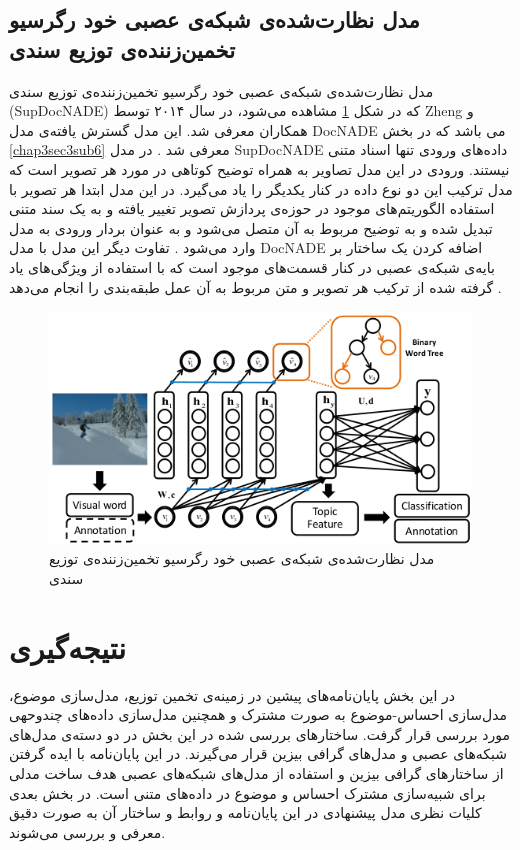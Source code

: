	\subsection{مدل نظارت‌شده‌ی شبکه‌‌ی عصبی خود رگرسیو تخمین‌زننده‌ی توزیع سندی}
	\label{chap3sec5sub1}
	مدل نظارت‌شده‌ی شبکه‌‌ی عصبی خود رگرسیو تخمین‌زننده‌ی توزیع سندی
	(SupDocNADE)
	 که در شکل 
	\ref{chap3-fig10}
	مشاهده می‌شود، در سال ۲۰۱۴ توسط
	Zheng
	و همکاران
	\cite{zheng2014topic}
	معرفی‌ شد. این مدل گسترش یافته‌ی مدل
	DocNADE
	می‌ باشد که در بخش
	\ref{chap3sec3sub6}
	معرفی‌ شد
	\cite{zheng2014topic}.
	 در مدل
	SupDocNADE
	داده‌های ورودی تنها اسناد متنی نیستند. ورودی در این مدل تصاویر به همراه توضیح کوتاهی‌ در مورد هر تصویر است که مدل ترکیب این دو 
	نوع داده در کنار یکدیگر را یاد می‌‌گیرد. در این مدل ابتدا هر تصویر با استفاده الگوریتم‌های موجود در حوزه‌ی پردازش تصویر تغییر یافته و به یک سند متنی تبدیل شده و به توضیح مربوط به آن متصل می‌شود و به عنوان بردار ورودی به مدل وارد می‌‌شود
	\cite{zheng2014topic}.
	 تفاوت دیگر این مدل با مدل
	DocNADE
	اضافه کردن یک ساختار بر بایه‌ی شبکه‌ی عصبی در کنار قسمت‌های موجود است که با استفاده از ویژگی‌‌های یاد گرفته شده از ترکیب هر تصویر و متن مربوط به آن عمل طبقه‌بندی را انجام می‌‌دهد
\cite{zheng2014topic}.
	
	\begin{figure}[!b]
		\centering
		\includegraphics[scale=0.6]{chap3-img/SupDocNADE}
		\caption{مدل نظارت‌شده‌ی شبکه‌‌ی عصبی خود رگرسیو تخمین‌زننده‌ی توزیع سندی \cite{zheng2014topic}}
		\label{chap3-fig10}
	\end{figure}

\section{نتیجه‌گیری}
در این بخش پایان‌‌نامه‌های پیشین در زمینه‌ی تخمین توزیع، مدل‌سازی موضوع، مدل‌سازی احساس‌-موضوع به صورت مشترک و همچنین مدل‌سازی داده‌های چندوحهی مورد بررسی‌ قرار گرفت. ساختار‌های بررسی‌ شده در این بخش در دو دسته‌ی مدل‌های شبکه‌های عصبی و مدل‌های گرافی‌ بیزین قرار می‌‌گیرند. در این پایان‌‌نامه با ایده‌
گرفتن از ساختار‌های گرافی بیزین و استفاده از مدل‌های شبکه‌های عصبی هدف ساخت مدلی‌ برای شبیه‌سازی مشترک احساس و موضوع در داده‌های متنی است. در بخش بعدی کلیات نظری مدل پیشنهادی در این پایان‌‌نامه و روابط و ساختار آن به صورت دقیق معرفی‌ و بررسی‌ می‌‌شوند.
 